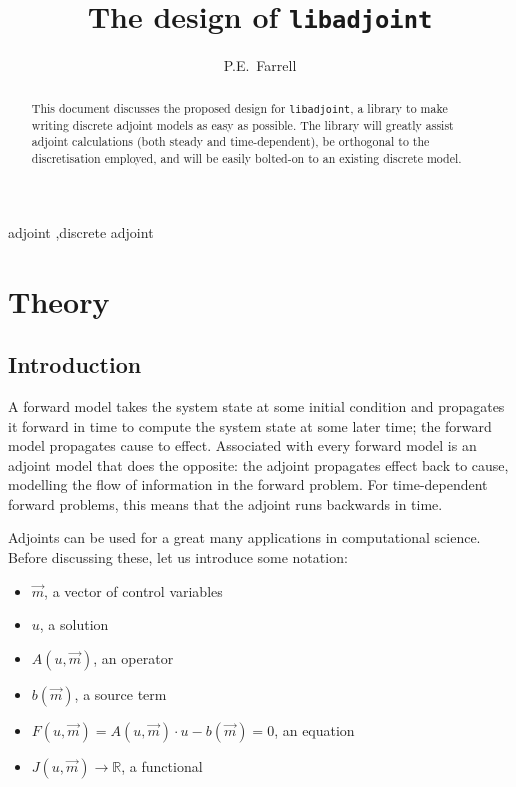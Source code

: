 \documentclass[10pt,authoryear]{elsarticle}
\newcommand{\m}[0]{{\vec{m}}}
\newcommand{\libadjoint}[0]{{\texttt{libadjoint}}}
\begin{document}
  \begin{frontmatter}
    \title{The design of \libadjoint}

    \author[ad1]{P.E.\ Farrell}
    \address[ad1]{Mathematical Institute\\
      University of Oxford}
    \begin{abstract}
This document discusses the proposed design for \libadjoint, a library to make
writing discrete adjoint models as easy as possible. The library will greatly assist
adjoint calculations (both steady and time-dependent), be orthogonal to the discretisation employed,
and will be easily bolted-on to an existing discrete model.
    \end{abstract}
    \begin{keyword}
      adjoint \sep discrete adjoint 
    \end{keyword}

  \end{frontmatter}

  \setcounter{section}{0}
  \setcounter{equation}{0}

\tableofcontents

\section{Theory}
\subsection{Introduction}

A forward model takes the system state at some initial condition and propagates it forward in time
to compute the system state at some later time; the forward model propagates cause to effect.
Associated with every forward model is an adjoint model that does the opposite: the adjoint propagates effect back to cause,
modelling the flow of information in the forward problem. For time-dependent forward problems, this means that
the adjoint runs backwards in time.

Adjoints can be used for a great many applications in computational science. Before discussing these, let us introduce some notation:
\begin{itemize}
\item $\m$, a vector of control variables
\item $u$, a solution
\item $A(u, \m)$, an operator
\item $b(\m)$, a source term
\item $F(u, \m) = A(u, \m)\cdot u - b(\m) = 0$, an equation
\item $J(u, \m) \rightarrow \mathbb{R}$, a functional
\end{itemize}
\end{document}
